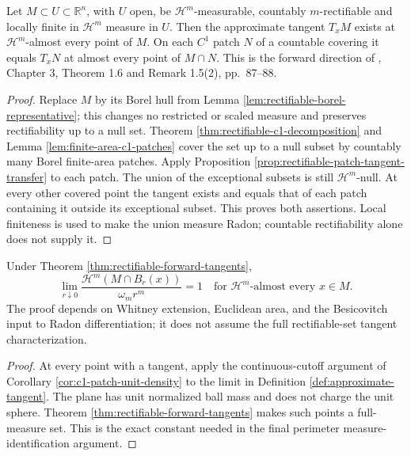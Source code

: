 \begin{theorem}\label{thm:rectifiable-forward-tangents}
Let $M\subset U\subset\mathbb R^n$, with $U$ open, be $\mathcal H^m$-measurable, countably $m$-rectifiable and locally finite in $\mathcal H^m$ measure in $U$. Then the approximate tangent $T_xM$ exists at $\mathcal H^m$-almost every point of $M$. On each $C^1$ patch $N$ of a countable covering it equals $T_xN$ at almost every point of $M\cap N$. This is the forward direction of \cite{Sim18}, Chapter 3, Theorem 1.6 and Remark 1.5(2), pp.~87--88.
\end{theorem}
\begin{proof}
Replace $M$ by its Borel hull from Lemma \ref{lem:rectifiable-borel-representative}; this changes no restricted or scaled measure and preserves rectifiability up to a null set. Theorem \ref{thm:rectifiable-c1-decomposition} and Lemma \ref{lem:finite-area-c1-patches} cover the set up to a null subset by countably many Borel finite-area patches. Apply Proposition \ref{prop:rectifiable-patch-tangent-transfer} to each patch. The union of the exceptional subsets is still $\mathcal H^m$-null. At every other covered point the tangent exists and equals that of each patch containing it outside its exceptional subset. This proves both assertions. Local finiteness is used to make the union measure Radon; countable rectifiability alone does not supply it.
\end{proof}

\begin{corollary}\label{cor:rectifiable-local-unit-density}
Under Theorem \ref{thm:rectifiable-forward-tangents},
\[
 \lim_{r\downarrow0}\frac{\mathcal H^m(M\cap B_r(x))}{\omega_mr^m}=1
 \quad\text{for }\mathcal H^m\text{-almost every }x\in M.
\]
The proof depends on Whitney extension, Euclidean area, and the Besicovitch input to Radon differentiation; it does not assume the full rectifiable-set tangent characterization.
\end{corollary}
\begin{proof}
At every point with a tangent, apply the continuous-cutoff argument of Corollary \ref{cor:c1-patch-unit-density} to the limit in Definition \ref{def:approximate-tangent}. The plane has unit normalized ball mass and does not charge the unit sphere. Theorem \ref{thm:rectifiable-forward-tangents} makes such points a full-measure set. This is the exact constant needed in the final perimeter measure-identification argument.
\end{proof}

